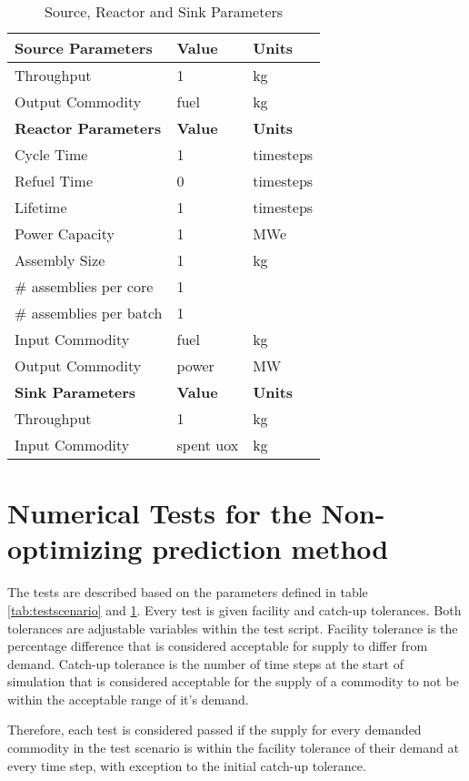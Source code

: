 \documentclass[11pt,letterpaper]{article}
\begin{document}
\begin{table}[H]
	\centering
    \caption {Source, Reactor and Sink Parameters}
	\label{tab:reactor}
	\begin{tabular}{|l|l|l|}
\hline
\textbf{Source Parameters} & \textbf{Value} & \textbf{Units} \\
\hline
Throughput & 1 & kg \\
Output Commodity & fuel & kg\\
\hline
\textbf{Reactor Parameters} & \textbf{Value} & \textbf{Units} \\
\hline
Cycle Time & 1 & timesteps \\
Refuel Time & 0 & timesteps \\
Lifetime & 1 & timesteps \\
Power Capacity & 1& MWe \\
Assembly Size & 1 & kg \\
\# assemblies per core & 1 & \\
\# assemblies per batch & 1 & \\
Input Commodity & fuel & kg\\
Output Commodity & power & MW\\
\hline
\textbf{Sink Parameters} & \textbf{Value} & \textbf{Units} \\
Throughput & 1 & kg \\
Input Commodity & spent uox & kg\\
\hline
	\end{tabular}
\end{table}

\pagebreak

\section{Numerical Tests for the Non-optimizing prediction method}
The tests are described based on the parameters defined in table \ref{tab:testscenario} and \ref{tab:reactor}. Every test is given facility and catch-up tolerances. Both tolerances are adjustable variables within the test script. Facility tolerance is the percentage difference that is considered acceptable for supply to differ from demand.  Catch-up tolerance is the number of time steps at the start of simulation that is considered acceptable for the supply of a commodity to not be within the acceptable range of it's demand. 

Therefore, each test is considered passed if the supply for every demanded commodity in the test scenario is within the facility tolerance of their demand at every time step, with exception to the initial catch-up tolerance.   
\end{document}
